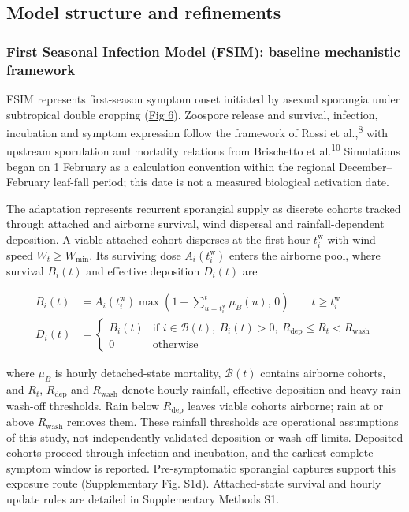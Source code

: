 \documentclass{article}
\begin{document}
\subsection{Model structure and
refinements}\label{model-structure-and-refinements}

\subsubsection{First Seasonal Infection Model (FSIM): baseline
mechanistic
framework}\label{first-seasonal-infection-model-fsim-baseline-mechanistic-framework}

FSIM represents first-season symptom onset initiated by asexual sporangia
under subtropical double cropping (\hyperref[_Ref_model_concept]{Fig 6}).
Zoospore release and survival, infection, incubation and symptom expression
follow the framework of Rossi et al.,\textsuperscript{8} with upstream
sporulation and mortality relations from Brischetto et al.\textsuperscript{10}
Simulations began on 1 February as a calculation convention within the
regional December--February leaf-fall period; this date is not a measured
biological activation date.

The adaptation represents recurrent sporangial supply as discrete cohorts
tracked through attached and airborne survival, wind dispersal and
rainfall-dependent deposition. A viable attached cohort disperses at the
first hour \(t_i^{\mathrm{w}}\) with wind speed \(W_t\geq W_{\min}\).
Its surviving dose \(A_i(t_i^{\mathrm{w}})\) enters the airborne pool,
where survival \(B_i(t)\) and effective deposition \(D_i(t)\) are

\begin{equation}
\begin{aligned}
B_i(t)&=A_i(t_i^{\mathrm{w}})
\max\!\left(1-\sum_{u=t_i^{\mathrm{w}}}^{t}\mu_B(u),\,0\right)
\qquad t\geq t_i^{\mathrm{w}}\\[4pt]
D_i(t)&=
\begin{cases}
B_i(t) & \text{if } i\in\mathcal{B}(t),\ B_i(t)>0,\
R_{\mathrm{dep}}\leq R_t<R_{\mathrm{wash}}\\
0 & \text{otherwise}
\end{cases}
\end{aligned}
\end{equation}

where \(\mu_B\) is hourly detached-state mortality,
\(\mathcal{B}(t)\) contains airborne cohorts, and \(R_t\),
\(R_{\mathrm{dep}}\) and \(R_{\mathrm{wash}}\) denote hourly rainfall,
effective deposition and heavy-rain wash-off thresholds. Rain below
\(R_{\mathrm{dep}}\) leaves viable cohorts airborne; rain at or above
\(R_{\mathrm{wash}}\) removes them. These rainfall thresholds are operational
assumptions of this study, not independently validated deposition or
wash-off limits. Deposited
cohorts proceed through infection and incubation, and the earliest
complete symptom window is reported. Pre-symptomatic sporangial captures
support this exposure route (Supplementary Fig. S1d).
Attached-state survival and hourly update rules are detailed in
Supplementary Methods S1.
\end{document}
